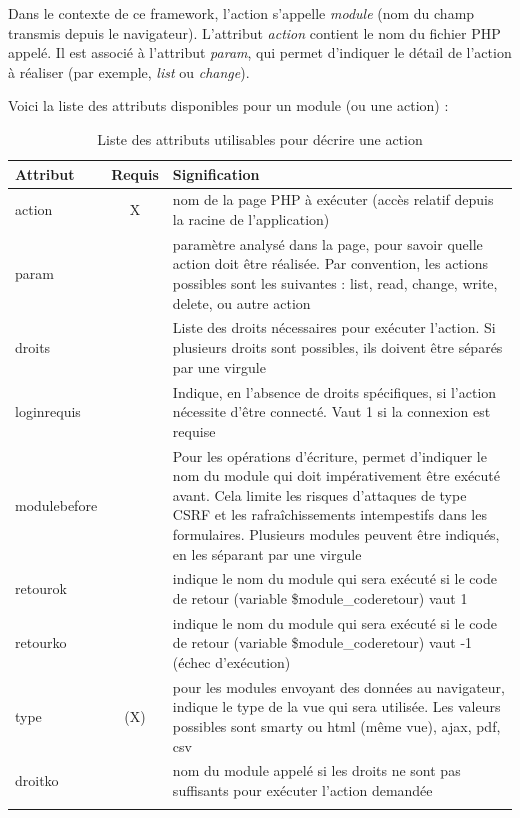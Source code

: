Dans le contexte de ce framework, l'action s'appelle \textit{module} (nom du champ transmis depuis le navigateur). L'attribut \textit{action} contient le nom du fichier PHP appelé. Il est associé à l'attribut \textit{param}, qui permet d'indiquer le détail de l'action à réaliser (par exemple, \textit{list} ou \textit{change}).

Voici la liste des attributs disponibles pour un module (ou une action) :
\begin{longtable}{|p{2.5cm}|c|p{9cm}|}
\hline
\textbf{Attribut} & \textbf{Requis} & \textbf{Signification} \\
\hline
\endhead
action & X & nom de la page PHP à exécuter (accès relatif depuis la racine de l'application) \\
 \hline
param &  & paramètre analysé dans la page, pour savoir quelle action doit être réalisée. Par convention, les actions possibles sont les suivantes : list, read, change, write, delete, ou autre action \\
 \hline
droits &  & Liste des droits nécessaires pour exécuter l'action. Si plusieurs droits sont possibles, ils doivent être séparés par une virgule\\
 \hline
loginrequis & & Indique, en l'absence de droits spécifiques, si l'action nécessite d'être connecté. Vaut 1 si la connexion est requise\\
 \hline
modulebefore & & Pour les opérations d'écriture, permet d'indiquer le nom du module qui doit impérativement être exécuté avant. Cela limite les risques d'attaques de type CSRF et les rafraîchissements intempestifs dans les formulaires. Plusieurs modules peuvent être indiqués, en les séparant par une virgule\\
 \hline
retourok & & indique le nom du module qui sera exécuté si le code de retour (variable \$module\_coderetour) vaut 1 \\
 \hline
retourko & & indique le nom du module qui sera exécuté si le code de retour (variable \$module\_coderetour) vaut -1 (échec d'exécution) \\
 \hline
type & (X) & pour les modules envoyant des données au navigateur, indique le type de la vue qui sera utilisée. Les valeurs possibles sont smarty ou html (même vue), ajax, pdf, csv  \\
 \hline
droitko & & nom du module appelé si les droits ne sont pas suffisants pour exécuter l'action demandée \\
\hline 
 
 \caption{Liste des attributs utilisables pour décrire une action}\label{actions}
\end{longtable}

